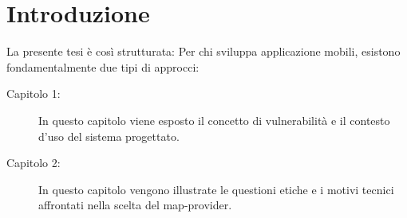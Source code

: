 \chapter*{Introduzione}
\thispagestyle{empty}


La presente tesi è così strutturata:
Per chi sviluppa applicazione mobili, esistono fondamentalmente due tipi di approcci:

\begin{description}
\item [Capitolo 1:] In questo capitolo viene esposto il concetto di vulnerabilità e il contesto d'uso del sistema progettato. 
\item [Capitolo 2:] In questo capitolo vengono illustrate le questioni etiche e i motivi tecnici affrontati nella scelta del map-provider.
\end{description}